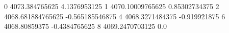 0 4073.384765625 4.1376953125
1 4070.10009765625 0.85302734375
2 4068.681884765625 -0.565185546875
4 4068.3271484375 -0.919921875
6 4068.80859375 -0.4384765625
8 4069.2470703125 0.0
